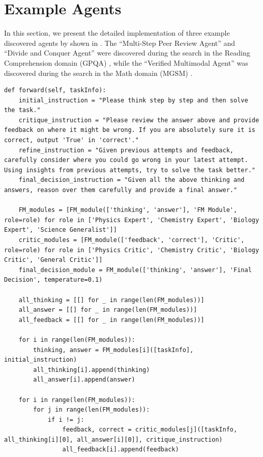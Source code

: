 \section{Example Agents}
\label{append_section:example_agents}

In this section, we present the detailed implementation of three example discovered agents by \ouralgo shown in . The ``Multi-Step Peer Review Agent'' and ``Divide and Conquer Agent'' were discovered during the search in the Reading Comprehension domain (GPQA) \citep{rein2023gpqa}, while the ``Verified Multimodal Agent'' was discovered during the search in the Math domain (MGSM) \citep{shi2023language}.

\begin{lstlisting}[style=pythonstyle, caption={Example discovered agent: Multi-Step Peer Review Agent}]
def forward(self, taskInfo):
    initial_instruction = "Please think step by step and then solve the task."
    critique_instruction = "Please review the answer above and provide feedback on where it might be wrong. If you are absolutely sure it is correct, output 'True' in 'correct'."
    refine_instruction = "Given previous attempts and feedback, carefully consider where you could go wrong in your latest attempt. Using insights from previous attempts, try to solve the task better."
    final_decision_instruction = "Given all the above thinking and answers, reason over them carefully and provide a final answer."

    FM_modules = [FM_module(['thinking', 'answer'], 'FM Module', role=role) for role in ['Physics Expert', 'Chemistry Expert', 'Biology Expert', 'Science Generalist']]
    critic_modules = [FM_module(['feedback', 'correct'], 'Critic', role=role) for role in ['Physics Critic', 'Chemistry Critic', 'Biology Critic', 'General Critic']]
    final_decision_module = FM_module(['thinking', 'answer'], 'Final Decision', temperature=0.1)

    all_thinking = [[] for _ in range(len(FM_modules))]
    all_answer = [[] for _ in range(len(FM_modules))]
    all_feedback = [[] for _ in range(len(FM_modules))]

    for i in range(len(FM_modules)):
        thinking, answer = FM_modules[i]([taskInfo], initial_instruction)
        all_thinking[i].append(thinking)
        all_answer[i].append(answer)

    for i in range(len(FM_modules)):
        for j in range(len(FM_modules)):
            if i != j:
                feedback, correct = critic_modules[j]([taskInfo, all_thinking[i][0], all_answer[i][0]], critique_instruction)
                all_feedback[i].append(feedback)


\end{lstlisting}
